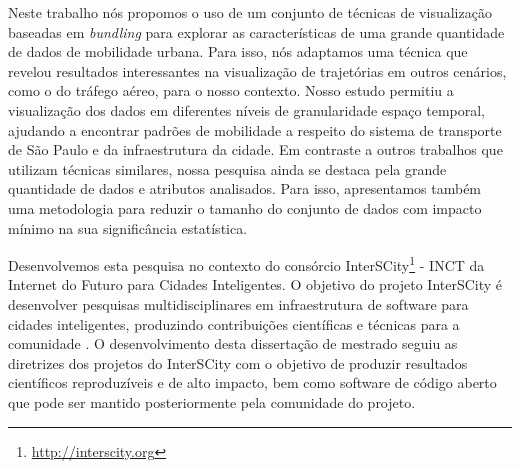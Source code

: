 Neste trabalho nós propomos o uso de um conjunto de técnicas de visualização
baseadas em \emph{bundling} para explorar as características de uma grande
quantidade de dados de mobilidade urbana. Para isso, nós adaptamos uma técnica
que revelou resultados interessantes na visualização de trajetórias em outros
cenários, como o do tráfego aéreo, para o nosso contexto. Nosso estudo permitiu
a visualização dos dados em diferentes níveis de granularidade espaço temporal,
ajudando a encontrar padrões de mobilidade a respeito do sistema de transporte
de S\~ao Paulo e da infraestrutura da cidade. Em contraste a outros trabalhos
que utilizam técnicas similares, nossa pesquisa ainda se destaca pela grande
quantidade de dados e atributos analisados. Para isso, apresentamos também uma
metodologia para reduzir o tamanho do conjunto de dados com impacto mínimo na
sua significância estatística.

Desenvolvemos esta pesquisa no contexto do consórcio
InterSCity\footnote{\url{http://interscity.org}} - INCT da Internet do Futuro
para Cidades Inteligentes. O objetivo do projeto InterSCity é desenvolver
pesquisas multidisciplinares em infraestrutura de software para cidades
inteligentes, produzindo contribuições científicas e técnicas para a comunidade
\cite{Daniel2016}. O desenvolvimento desta dissertação de mestrado seguiu as
diretrizes dos projetos do InterSCity com o objetivo de produzir resultados
científicos reproduzíveis e de alto impacto, bem como software de código aberto
que pode ser mantido posteriormente pela comunidade do projeto.